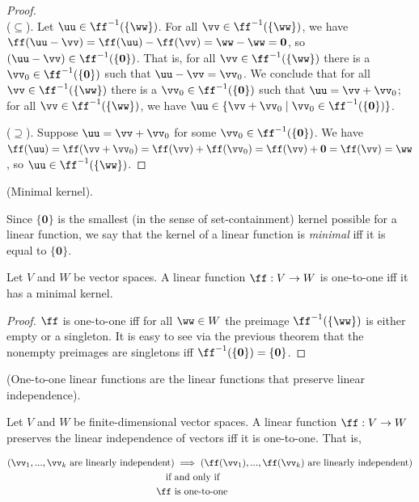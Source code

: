 \begin{proof} \mbox{} \\ \indent
   ($\subseteq$). Let $\uu \in \ff^{-1}(\{\ww\})$. For all $\vv \in \ff^{-1}(\{\ww\})$, we have $\ff(\uu - \vv) = \ff(\uu) - \ff(\vv) = \ww - \ww = \mathbf{0}$, so $(\uu - \vv) \in \ff^{-1}(\{\mathbf{0}\})$. That is, for all $\vv \in \ff^{-1}(\{\ww\})$ there is a $\vv_0 \in \ff^{-1}(\{\mathbf{0}\})$ such that $\uu - \vv = \vv_0$. We conclude that for all $\vv \in \ff^{-1}(\{\ww\})$ there is a $\vv_0 \in \ff^{-1}(\{\mathbf{0}\})$ such that $\uu = \vv + \vv_0$; for all $\vv \in \ff^{-1}(\{\ww\})$, we have $\uu \in \{\vv + \vv_0 \mid \vv_0 \in \ff^{-1}(\{\mathbf{0}\})\}$. 
   
   ($\supseteq$). Suppose $\uu = \vv + \vv_0$ for some $\vv_0 \in \ff^{-1}(\{\mathbf{0}\})$. We have $\ff(\uu) = \ff(\vv + \vv_0) = \ff(\vv) + \ff(\vv_0) = \ff(\vv) + \mathbf{0} = \ff(\vv) = \ww$, so $\uu \in \ff^{-1}(\{\ww\})$.
\end{proof}

\begin{defn}
    (Minimal kernel).
    
    Since $\{\mathbf{0}\}$ is the smallest (in the sense of set-containment) kernel possible for a linear function, we say that the kernel of a linear function is \textit{minimal} iff it is equal to $\{\mathbf{0}\}$.
\end{defn}

\begin{theorem}
\label{ch::lin_alg::thm::linear_fn_1-1_minimal_kernel}
    Let $V$ and $W$ be vector spaces. A linear function $\ff:V \rightarrow W$ is one-to-one iff it has a minimal kernel.
\end{theorem}

\begin{proof}
    $\ff$ is one-to-one iff for all $\ww \in W$ the preimage $\ff^{-1}(\{\ww\})$ is either empty or a singleton. It is easy to see via the previous theorem that the nonempty preimages are singletons iff $\ff^{-1}(\{\mathbf{0}\}) = \{\mathbf{0}\}$.
\end{proof}

\begin{theorem}
\label{ch::lin_alg::thm::one_to_one_linear_fns_are_the_linear_fns_preserving_linear_independence}

    (One-to-one linear functions are the linear functions that preserve linear independence). 
    
    Let $V$ and $W$ be finite-dimensional vector spaces. A linear function $\ff:V \rightarrow W$ preserves the linear independence of vectors iff it is one-to-one. That is, 
    
    \begin{align*}
       (\vv_1, ..., \vv_k \text{ are linearly independent}) &\implies (\ff(\vv_1), ..., \ff(\vv_k) \text{ are linearly independent})\\
        \text{if} \text{ } &\text{and only if} \\
        \ff \text{ } &\text{is one-to-one}
    \end{align*}
\end{theorem}

